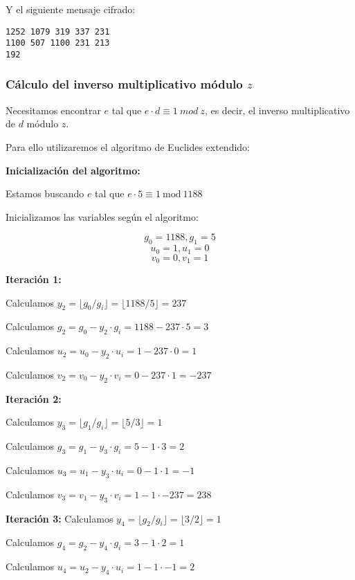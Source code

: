 {Y el siguiente mensaje cifrado:

\begin{verbatim}
1252 1079 319 337 231
1100 507 1100 231 213
192
\end{verbatim}

\subsubsection{Cálculo del inverso multiplicativo módulo $z$}

Necesitamos encontrar $e$ tal que $e \cdot d \equiv 1 ~mod~z$, es decir, el inverso multiplicativo de $d$ módulo $z$.

Para ello utilizaremos el algoritmo de Euclides extendido:

\textbf{Inicialización del algoritmo:}

Estamos buscando $e$ tal que $e \cdot 5 \equiv 1 ~\text{mod}~{1188}$

Inicializamos las variables según el algoritmo:

$$g_0 = 1188, g_1 = 5$$
$$u_0 = 1, u_1 = 0$$
$$v_0 = 0, v_1 = 1$$



\textbf{Iteración 1:}

Calculamos $y_2 = \lfloor g_0 / g_i \rfloor = \lfloor 1188 / 5 \rfloor = 237$

Calculamos $g_2 = g_0 - y_2 \cdot g_i = 1188 - 237 \cdot 5 = 3$

Calculamos $u_2 = u_0 - y_2 \cdot u_i = 1 - 237 \cdot 0 = 1$

Calculamos $v_2 = v_0 - y_2 \cdot v_i = 0 - 237 \cdot 1 = -237$



\textbf{Iteración 2:}

Calculamos $y_3 = \lfloor g_1 / g_i \rfloor = \lfloor 5 / 3 \rfloor = 1$

Calculamos $g_3 = g_1 - y_3 \cdot g_i = 5 - 1 \cdot 3 = 2$

Calculamos $u_3 = u_1 - y_3 \cdot u_i = 0 - 1 \cdot 1 = -1$

Calculamos $v_3 = v_1 - y_3 \cdot v_i = 1 - 1 \cdot -237 = 238$



\textbf{Iteración 3:}
Calculamos $y_4 = \lfloor g_2 / g_i \rfloor = \lfloor 3 / 2 \rfloor = 1$

Calculamos $g_4 = g_2 - y_4 \cdot g_i = 3 - 1 \cdot 2 = 1$

Calculamos $u_4 = u_2 - y_4 \cdot u_i = 1 - 1 \cdot -1 = 2$

}
